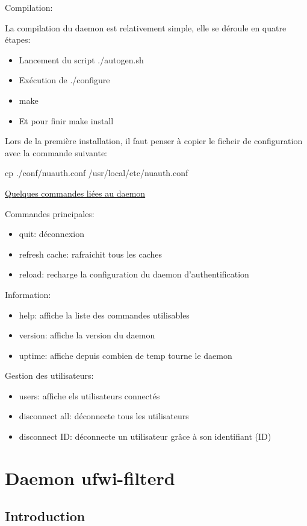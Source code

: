 \documentclass[12pt]{report}
\begin{document}
Compilation:

La compilation du daemon est relativement simple, elle se déroule en quatre étapes:
  \begin{itemize}
   \item Lancement du script ./autogen.sh
   \item Exécution de ./configure
   \item make
   \item Et pour finir make install
  \end{itemize}
Lors de la première installation, il faut penser à copier le ficheir de configuration avec la commande suivante:

cp ./conf/nuauth.conf /usr/local/etc/nuauth.conf

\underline{Quelques commandes liées au daemon}

Commandes principales:
\begin{itemize}
  \item quit: déconnexion
  \item refresh cache: rafraichit tous les caches
  \item reload: recharge la configuration du daemon d'authentification 
\end{itemize}
Information:
\begin{itemize}
  \item help: affiche la liste des commandes utilisables
  \item version: affiche la version du daemon
  \item uptime: affiche depuis combien de temp tourne le daemon 
\end{itemize}
Gestion des utilisateurs:
\begin{itemize}
  \item users: affiche els utilisateurs connectés
  \item disconnect all: déconnecte tous les utilisateurs
  \item disconnect ID: déconnecte un utilisateur grâce à son identifiant (ID) 
\end{itemize}

\chapter{Daemon ufwi-filterd}
\section{Introduction}
\end{document}
